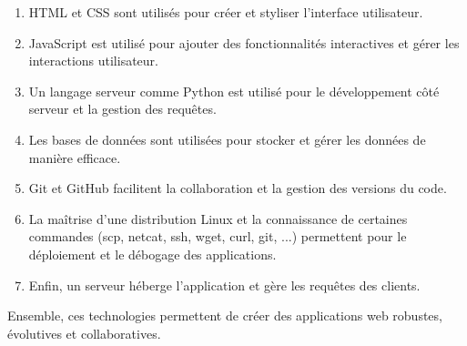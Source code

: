 \documentclass[a4paper,11pt]{article}
\begin{document}
        \begin{enumerate}
            \item HTML et CSS sont utilisés pour créer et styliser l'interface utilisateur.
            \item JavaScript est utilisé pour ajouter des fonctionnalités interactives et 
            gérer les interactions utilisateur.
            \item Un langage serveur comme Python est utilisé pour le développement côté serveur et la gestion des requêtes.
            \item Les bases de données sont utilisées pour stocker et gérer les données de manière efficace. 
            \item Git et GitHub facilitent la collaboration et la gestion des versions du code. 
            \item La maîtrise d'une distribution Linux et la connaissance de certaines commandes (scp, netcat, ssh, wget, curl, git, ...) 
            permettent pour le déploiement et le débogage des applications. 
            \item   Enfin, un serveur héberge l'application et gère les requêtes des clients. 
        \end{enumerate}

        \noindent Ensemble, ces technologies permettent de créer des applications web robustes, évolutives et collaboratives.
\end{document}

